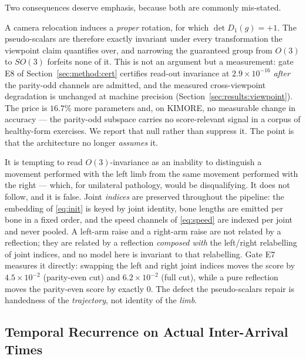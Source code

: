 Two consequences deserve emphasis, because both are commonly mis-stated.

\begin{remark}
\label{rem:parity}
A camera relocation induces a \emph{proper} rotation, for which $\det D_1(g)=+1$. The pseudo-scalars
are therefore exactly invariant under every transformation the viewpoint claim quantifies over, and
narrowing the guaranteed group from $O(3)$ to $SO(3)$ forfeits none of it. This is not an argument but
a measurement: gate E8 of Section~\ref{sec:method:cert} certifies read-out invariance at
$2.9\times10^{-16}$ \emph{after} the parity-odd channels are admitted, and the measured cross-viewpoint
degradation is unchanged at machine precision (Section~\ref{sec:results:viewpoint}). The price is
$16.7\%$ more parameters and, on KIMORE, no measurable change in accuracy --- the parity-odd subspace
carries no score-relevant signal in a corpus of healthy-form exercises. We report that null rather than
suppress it. The point is that the architecture no longer \emph{assumes} it.
\end{remark}

\begin{remark}
\label{rem:laterality}
It is tempting to read $O(3)$-invariance as an inability to distinguish a movement performed with the
left limb from the same movement performed with the right --- which, for unilateral pathology, would be
disqualifying. It does not follow, and it is false. Joint \emph{indices} are preserved throughout the
pipeline: the embedding of \eqref{eq:init} is keyed by joint identity, bone lengths are emitted per
bone in a fixed order, and the speed channels of \eqref{eq:speed} are indexed per joint and never
pooled. A left-arm raise and a right-arm raise are not related by a reflection; they are related by a
reflection \emph{composed with} the left/right relabelling of joint indices, and no model here is
invariant to that relabelling. Gate E7 measures it directly: swapping the left and right joint indices
moves the score by $4.5\times10^{-2}$ (parity-even cut) and $6.2\times10^{-2}$ (full cut), while a pure
reflection moves the parity-even score by exactly $0$. The defect the pseudo-scalars repair is
handedness of the \emph{trajectory}, not identity of the \emph{limb}.
\end{remark}

\subsection{Temporal Recurrence on Actual Inter-Arrival Times}
\label{sec:method:recurrence}

